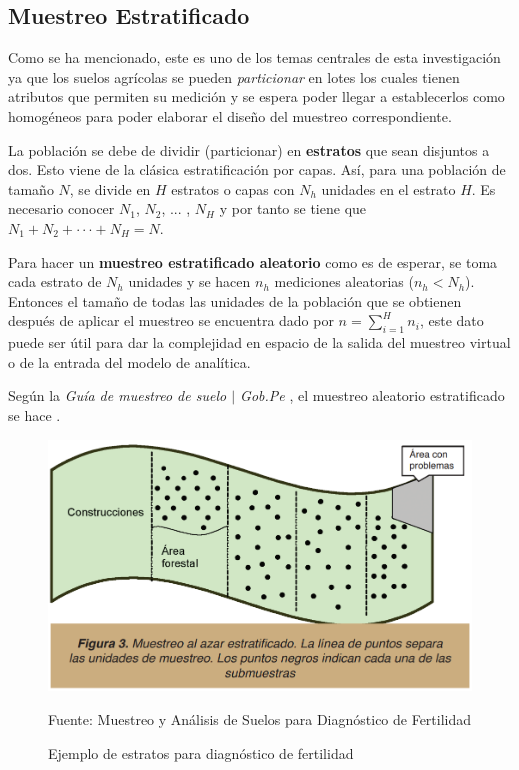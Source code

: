 \documentclass[conference]{IEEEtran}
\begin{document}
\subsection{Muestreo Estratificado}

Como se ha mencionado, este es uno de los temas centrales de esta investigación ya que los suelos agrícolas se pueden \textit{particionar} en lotes los cuales tienen atributos que permiten su medición y se espera poder llegar a establecerlos como homogéneos para poder elaborar el diseño del muestreo correspondiente.

\bigbreak

La población se debe de dividir (particionar) en \textbf{estratos} que sean disjuntos a dos. Esto viene de la clásica estratificación por capas. Así, para una población de tamaño $N$, se divide en $H$ estratos o capas con $N_h$ unidades en el estrato $H$. Es necesario conocer $N_1$, $N_2$, ... , $N_H$ y por tanto se tiene que $N_1 + N_2 + \cdot \cdot \cdot + N_H = N$.

\bigbreak

Para hacer un \textbf{muestreo estratificado aleatorio} como es de esperar, se toma cada estrato de $N_h$ unidades y se hacen $n_h$ mediciones aleatorias ($n_h < N_h$). Entonces el tamaño de todas las unidades de la población que se obtienen después de aplicar el muestreo se encuentra dado por $n = \sum \limits_{i=1}^H n_i$, este dato puede ser útil para dar la complejidad en espacio de la salida del muestreo virtual o de la entrada del modelo de analítica.

\bigbreak

Según la \textit{Guía de muestreo de suelo $\mid$ Gob.Pe} \cite{gobpe-ministerio-del-ambiente-2014}, el muestreo aleatorio estratificado se hace .

\begin{figure}[H]
    \centering
    \includegraphics[width=0.3\paperwidth]{ref/stratified-sampling-examples.png}
    \caption{Ejemplo de estratos para diagnóstico de fertilidad} \footnotesize
    Fuente: Muestreo y Análisis de Suelos para Diagnóstico de Fertilidad \cite{lassaga-2011}
\end{figure}
\end{document}
